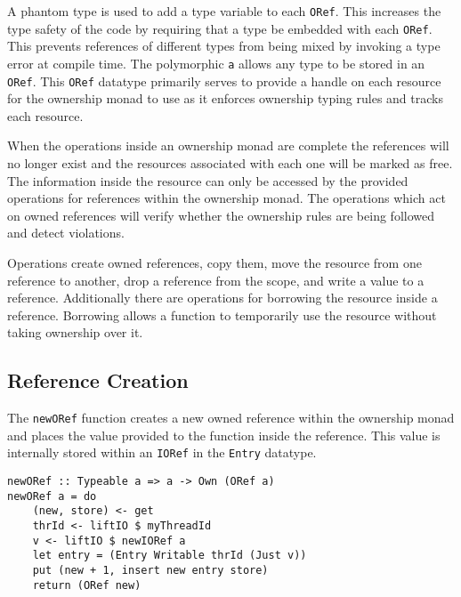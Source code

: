 \documentclass[onehalf,11pt]{beavtex}
\begin{document}
A phantom type is used to add a type variable to each \texttt{ORef}. This
increases the type safety of the code by requiring that a type be embedded
with each \texttt{ORef}.
This prevents references of different types from being mixed by invoking a
type error at compile time.
The polymorphic \texttt{a} allows any type to be stored in an \texttt{ORef}.
This \texttt{ORef} datatype primarily serves to provide a handle on each
resource for the ownership monad to use as it enforces ownership typing rules
and tracks each resource.

When the operations inside an ownership monad are complete the references
will no longer exist and the resources associated with each one will be marked
as free.
The information inside the resource can only be accessed by the provided
operations for references within the ownership monad.
The operations which act on owned references will verify whether the ownership
rules are being followed and detect violations.

Operations create owned references, copy them, move the resource from one
reference to another, drop a reference from the scope, and write a value to a
reference.
Additionally there are operations for borrowing the resource inside a reference.
Borrowing allows a function to temporarily use the resource without taking
ownership over it.

\subsection{Reference Creation}

The \texttt{newORef} function creates a new owned reference
within the ownership monad and places the value provided to the function
inside the reference. This value is internally stored within an \texttt{IORef}
in the \texttt{Entry} datatype.

\begin{verbatim}
newORef :: Typeable a => a -> Own (ORef a)
newORef a = do
    (new, store) <- get
    thrId <- liftIO $ myThreadId
    v <- liftIO $ newIORef a
    let entry = (Entry Writable thrId (Just v))
    put (new + 1, insert new entry store)
    return (ORef new)
\end{verbatim}
\end{document}
